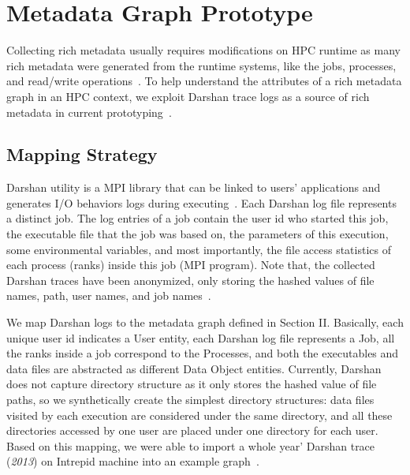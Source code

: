 \section{Metadata Graph Prototype}
Collecting rich metadata usually requires modifications on HPC runtime as many rich metadata were generated from the runtime systems, like the jobs, processes, and read/write operations~\cite{muniswamy2006provenance,muniswamy2009layering, braun2006issues}. To help understand the attributes of a rich metadata graph in an HPC context, we exploit Darshan trace logs as a source of rich metadata in current prototyping~\cite{carns200924}.

\subsection{Mapping Strategy}
Darshan utility is a MPI library that can be linked to users' applications and generates I/O behaviors logs during executing~\cite{carns2011understanding}. Each Darshan log file represents a distinct job. The log entries of a job contain the user id who started this job, the executable file that the job was based on, the parameters of this execution, some environmental variables, and most importantly, the file access statistics of each process (ranks) inside this job (MPI program). Note that, the collected Darshan traces have been anonymized, only storing the hashed values of file names, path, user names, and job names~\cite{darshanlog2013}.

We map Darshan logs to the metadata graph defined in Section II. Basically, each unique user id indicates a User entity, each Darshan log file represents a Job, all the ranks inside a job correspond to the Processes, and both the executables and data files are abstracted as different Data Object entities. Currently, Darshan does not capture directory structure as it only stores the hashed value of file paths, so we synthetically create the simplest directory structures: data files visited by each execution are considered under the same directory, and all these directories accessed by one user are placed under one directory for each user. Based on this mapping, we were able to import a whole year' Darshan trace (\textit{2013}) on Intrepid machine into an example graph~\cite{darshanlog2013}.

